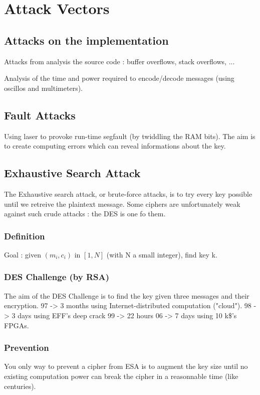\chapter{Attack Vectors}

\section{Attacks on the implementation}
Attacks from analysis the source code : buffer overflows, stack overflows, ...

Analysis of the time and power required to encode/decode messages (using oscillos and multimeters).

\section{Fault Attacks}
Using laser to provoke run-time segfault (by twiddling the RAM bits). The aim is to create computing errors which can reveal informations about the key.

\section{Exhaustive Search Attack}
    The Exhaustive search attack, or brute-force attacks, is to try every key possible until we retreive the plaintext message.
    Some ciphers are unfortunately weak against such crude attacks : the DES is one fo them.
    
\subsection{Definition}
Goal : given $(m_i,c_i)$ in $[1,N]$ (with N a small integer), find key k.

\subsection{DES Challenge (by RSA)}
The aim of the DES Challenge is to find the key given three messages and their encryption.
97 -> 3 months using Internet-distributed computation ("cloud").
98 -> 3 days using EFF's deep crack
99 -> 22 hours
06 -> 7 days using 10 k\$'s FPGAs.

\subsection{Prevention}
You only way to prevent a cipher from ESA is to augment the key size until no existing computation power can break the cipher in a reasonnable time (like centuries).

